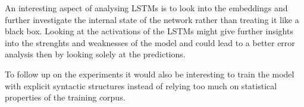 \documentclass[11pt,a4paper]{article}
\begin{document}
An interesting aspect of analysing LSTMs is to look into the embeddings and further investigate the internal state of the network rather than treating it like a black box. Looking at the activations of the LSTMs might give further insights into the strenghts and weaknesses of the model and could lead to a better error analysis then by looking solely at the predictions. 

To follow up on the experiments it would also be interesting to train the model with explicit syntactic structures instead of relying too much on statistical properties of the training corpus.





%
%


\end{document}
